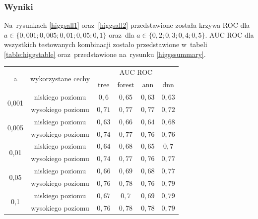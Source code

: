 \subsubsection{Wyniki}
Na~rysunkach \ref{higgsall1} oraz~\ref{higgsall2} przedstawione została krzywa ROC dla $a\in\{0,001; 0,005; 0,01; 0,05; 0,1\}$  oraz~dla $a\in\{0,2; 0,3; 0,4; 0,5\}$. AUC ROC dla wszystkich testowanych kombinacji zostało przedstawione w~tabeli \ref{table:higgstable} oraz~przedstawione na~rysunku \ref{higgssummary}.


\begin{table}[]
\centering
\begin{tabular}{|c|c|c|c|c|c|}
\hline
\multirow{2}{*}{a}                      &  \multirow{2}{*}{wykorzystane cechy} & \multicolumn{4}{c|}{AUC ROC} \\ \cline{3-6}

 &       & tree & forest & ann & dnn \\ \hline

\multirow{2}{*}{0,001} & niskiego poziomu   & $ 0,6 $ & $ 0,65 $ & $ 0,63 $ &$ 0,63 $ \\ \cline{2-6} 
                       & wysokiego poziomu & $ 0,71 $ & $ 0,77 $ & $ 0,77 $ &$ 0,72 $ \\ \hline 
                       
\multirow{2}{*}{0,005} & niskiego poziomu & $ 0,63 $ & $ 0,66 $ & $ 0,64 $ &$ 0,68 $ \\ \cline{2-6} 
                       & wysokiego poziomu & $ 0,74 $ & $ 0,77 $ & $ 0,76 $ &$ 0,76 $ \\ \hline
                       
\multirow{2}{*}{0,01}  & niskiego poziomu  & $ 0,64 $ & $ 0,68 $ & $ 0,65 $ &$ 0,7 $ \\ \cline{2-6} 
                       & wysokiego poziomu & $ 0,74 $ & $ 0,77 $ & $ 0,76 $ &$ 0,77 $ \\ \hline
                       
\multirow{2}{*}{0,05}  & niskiego poziomu  & $ 0,66 $ & $ 0,69 $ & $ 0,68 $ &$ 0,77 $  \\ \cline{2-6} 
                       & wysokiego poziomu & $ 0,76 $ & $ 0,78 $ & $ 0,76 $ &$ 0,79 $ \\ \hline
                       
\multirow{2}{*}{0,1}   & niskiego poziomu  & $ 0,67 $ & $ 0,7 $ & $ 0,69 $ &$ 0,79 $ \\ \cline{2-6} 
                       & wysokiego poziomu & $ 0,76 $ & $ 0,78 $ & $ 0,78 $ &$ 0,79 $ \\ \hline
                       

\end{tabular}
\end{table}
